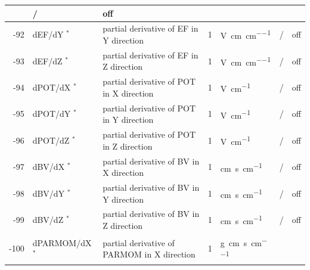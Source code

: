 \begin{landscape}
\begin{longtable}{|r|l|l|l|l|c|c|}
			   & /              & off
    \\ \hline
    -92                    & dEF/dY $^*$
                           & partial derivative of EF in Y direction
                           & 1                            & \si{\volt\per\centi\metre\per\centi\metre}
			   & /              & off
    \\ \hline
    -93                    & dEF/dZ $^*$
                           & partial derivative of EF in Z direction
                           & 1                            & \si{\volt\per\centi\metre\per\centi\metre}
			   & /               & off
    \\ \hline
    -94                    & dPOT/dX $^*$
                           & partial derivative of POT in X direction
                           & 1                            & \si{\volt\per\centi\metre}
			   & /              & off
    \\ \hline
    -95                    & dPOT/dY $^*$
                           & partial derivative of POT in Y direction
                           & 1                            & \si{\volt\per\centi\metre}
			   & /              & off
    \\ \hline
    -96                    & dPOT/dZ $^*$
                           & partial derivative of POT in Z direction
                           & 1                            & \si{\volt\per\centi\metre}
			   & /              & off
    \\ \hline
    -97                    & dBV/dX $^*$
                           & partial derivative of BV in X direction
                           & 1                            & \si{\centi\metre\second\per\centi\metre}
			   & /              & off
    \\ \hline
    -98                    & dBV/dY $^*$
                           & partial derivative of BV in Y direction
                           & 1                            & \si{\centi\metre\second\per\centi\metre}
			   & /              & off
    \\ \hline
    -99                    & dBV/dZ $^*$
                           & partial derivative of BV in Z direction
                           & 1                            & \si{\centi\metre\second\per\centi\metre}
			   & /              & off
    \\ \hline
    -100                   & dPARMOM/dX $^*$
                           & partial derivative of PARMOM in X direction
                           & 1                            & \si{\gram\centi\metre\per\second\per\centi\metre}

\end{longtable}
\end{landscape}
